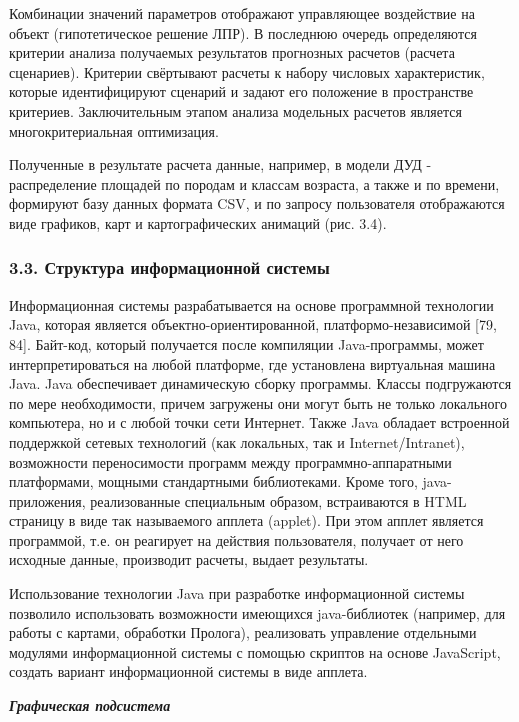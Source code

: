 \documentclass{article}
\begin{document}
Комбинации значений параметров отображают 
управляющее воздействие на объект (гипотетическое 
решение ЛПР). В последнюю очередь определяются 
критерии\textit{ }анализа получаемых результатов 
прогнозных расчетов (расчета сценариев). Критерии 
свёртывают расчеты к набору числовых характеристик, 
которые идентифицируют сценарий и задают его 
положение в пространстве\textit{ }критериев. Заключительным 
этапом анализа модельных расчетов является 
многокритериальная оптимизация.

Полученные в результате расчета данные, например, 
в модели ДУД - распределение площадей по породам 
и классам возраста, а также и по времени, формируют 
базу данных формата CSV, и по запросу пользователя 
отображаются виде графиков, карт и  картографических 
анимаций (рис. 3.4).\label{HToc128995781}\label{HToc199746727}

\subsubsection*{\textbf{3.3. Структура информационной системы}}

Информационная системы разрабатывается на 
основе программной технологии Java, которая является 
объектно-ориентированной,  платформо-независимой 
[79, 84]. Байт-код, который получается после компиляции 
Java-программы, может интерпретироваться на любой 
платформе, где установлена виртуальная машина 
Java. Java обеспечивает динамическую сборку программы. 
Классы подгружаются по мере необходимости, 
причем загружены они могут быть не только  локального 
компьютера, но и с любой точки сети Интернет. 
Также Java обладает встроенной поддержкой сетевых 
технологий (как локальных, так и Internet/Intranet), 
возможности переносимости программ между программно-аппаратными 
платформами, мощными стандартными библиотеками. 
Кроме того, java-приложения, реализованные специальным 
образом, встраиваются в HTML страницу в виде так 
называемого апплета (applet). При этом апплет является 
программой, т.е. он реагирует на действия пользователя, 
получает от него исходные данные, производит 
расчеты, выдает результаты.

Использование технологии Java при разработке 
информационной системы позволило использовать 
возможности имеющихся java-библиотек (например, 
для работы с картами, обработки Пролога), реализовать 
управление отдельными модулями информационной 
системы с помощью скриптов на основе JavaScript, 
создать вариант информационной системы в виде 
апплета.

\textit{\textbf{Графическая подсистема}}
\end{document}
